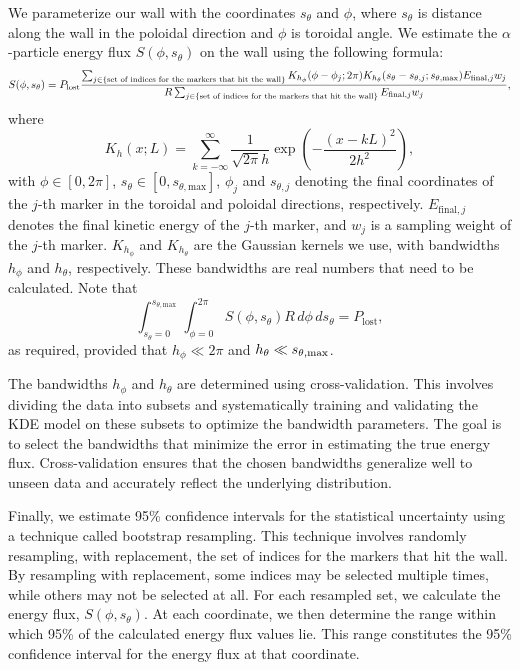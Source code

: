 \documentclass[10pt, a4paper, twoside]{article}
\begin{document}
We parameterize our wall with the coordinates \(s_\theta\) and \(\phi\), where \(s_\theta\) is distance along the wall in the poloidal direction and \(\phi\) is toroidal angle. We estimate the $\alpha$-particle energy flux \(S(\phi, s_\theta)\) on the wall using the following formula:
\begin{equation}
  S(\phi, s_\theta) = P_{\text{lost}}\frac{\sum_{j \in \{\text{set of indices for the markers that hit the wall}\}} K_{h_{\phi}}\qty(\phi - \phi_j; 2\pi) K_{h_{\theta}}(s_\theta - s_{\theta,j}; s_{\theta, \text{max}}) E_{\text{final}, j} w_j}{R \sum_{j \in \{\text{set of indices for the markers that hit the wall}\}} E_{\text{final}, j} w_j},  
\end{equation}
where
\begin{equation}
 K_h(x; L) = \sum_{k=-\infty}^\infty \frac{1}{\sqrt{2\pi} h} \exp\left(-\frac{(x - kL)^2}{2h^2}\right),   
\end{equation}
with \(\phi \in [0, 2\pi]\), \(s_\theta \in [0, s_{\theta, \text{max}}]\), \(\phi_j\) and \(s_{\theta,j}\) denoting the final coordinates of the \(j\)-th marker in the toroidal and poloidal directions, respectively. \(E_{\text{final}, j}\) denotes the final kinetic energy of the \(j\)-th marker, and \(w_j\) is a sampling weight of the \(j\)-th marker. \(K_{h_{\phi}}\) and \(K_{h_{\theta}}\) are the Gaussian kernels we use, with bandwidths \(h_{\phi}\) and \(h_{\theta}\), respectively. These bandwidths are real numbers that need to be calculated.
Note that
\begin{equation}
\int_{s_\theta=0}^{s_{\theta,\text{max}}}\int_{\phi=0}^{2\pi} S(\phi, s_\theta) R \, d\phi \, ds_\theta = P_{\text{lost}},
\end{equation}
as required, provided that $h_{\phi} \ll 2\pi$ and $h_{\theta} \ll s_{\theta,{\rm max}}$.

The bandwidths \(h_{\phi}\) and \(h_{\theta}\) are determined using cross-validation. This involves dividing the data into subsets and systematically training and validating the KDE model on these subsets to optimize the bandwidth parameters. The goal is to select the bandwidths that minimize the error in estimating the true energy flux. Cross-validation ensures that the chosen bandwidths generalize well to unseen data and accurately reflect the underlying distribution.

Finally, we estimate 95\% confidence intervals for the statistical uncertainty using a technique called bootstrap resampling. This technique involves randomly resampling, with replacement, the set of indices for the markers that hit the wall. By resampling with replacement, some indices may be selected multiple times, while others may not be selected at all. For each resampled set, we calculate the energy flux, \(S(\phi, s_\theta)\). At each coordinate, we then determine the range within which 95\% of the calculated energy flux values lie. This range constitutes the 95\% confidence interval for the energy flux at that coordinate.
\end{document}

